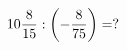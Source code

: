 \documentclass[preview]{standalone}
\begin{document}
\begin{align*}
10 { 8 \over 15 }  :  \left( - { 8 \over 75 } \right) =  ?
\end{align*}
\end{document}

